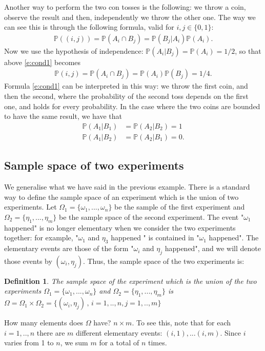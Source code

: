 \documentclass[12pt]{article}
\newtheorem{definition}[theorem]{Definition}
\newcommand{\<}{{\langle \!\! \langle}}
\renewcommand{\>}{{\rangle \!\! \rangle}}
\newcommand{\bel}[2]{\begin{equation} \label{#1} \begin{split} #2
 					\end{split} \end{equation}}
\begin{document}
Another way to perform the two con tosses is the following: we throw a coin, observe the result and then, independently we throw the other one. The way we can see this is through the following formula, valid for $i,j\in\{0,1\}$: 
\bel{e:cond1}{\mathbb{P}((i,j))=\mathbb{P}(A_i\cap B_j)=\mathbb{P}(B_j|A_i)\mathbb{P}(A_i).}
Now we use the hypothesis of independence: $\mathbb{P}(A_i | B_j) = \mathbb{P}(A_i) =1/2 $, so that above \eqref{e:cond1} becomes 
\bel{}{\mathbb{P}(i,j) = \mathbb{P}(A_i \cap B_j) = \mathbb{P}(A_i)\mathbb{P}(B_j) = 1/4.}
Formula \eqref{e:cond1} can be interpreted in this way: we throw the first coin, and then the second, where the probability of the second toss depends on the first one, and holds for every probability. In the case where the two coins are bounded to have the same result, we have that \bel{}{\mathbb{P}(A_1|B_1) &  =\mathbb{P}(A_2|B_2) = 1\\ \mathbb{P}(A_1|B_2) &= \mathbb{P}(A_2| B_1) = 0.} 

\subsection{Sample space of two experiments}

We generalise what we have said in the previous example. There is a standard way to define the sample space of an experiment which is the union of two experiments. Let $\Omega_1=\{\omega_1,...,\omega_n\}$ be the sample of the first experiment and $\Omega_2 =\{\eta_1,...,\eta_m\}$ be the sample space of the second experiment. The  event "$\omega_1$ happened" is no longer elementary when we consider the two experiments together: for example, "$\omega_1$ and $\eta_3$ happened " is contained in "$\omega_1 $ happened". The elementary events are those of the form "$\omega_i$ and $\eta_j$ happened", and we will denote those events by $(\omega_i,\eta_j)$. Thus, the sample space of the two experiments is: 
\begin{definition}
The sample space of the experiment which is the union of the two experiments $\Omega_1=\{\omega_1,...,\omega_n\}$ and $\Omega_2=\{\eta_1,...,\eta_m\}$ is $\Omega=\Omega_1\times \Omega_2=\{(\omega_i,\eta_j)\,,\,i=1,..,n, j=1,..,m\}$
\end{definition}
\begin{ExerciseList}

\Exercise How many elements does $\Omega$ have?
\Answer $n\times m $. To see this, note that for each $i=1,..,n$ there are $m$ different elementary events: $(i,1),...(i,m)$. Since $i$ varies from 1 to $n$, we sum $m$ for a total of $n$ times.

\end{ExerciseList}
\end{document}
